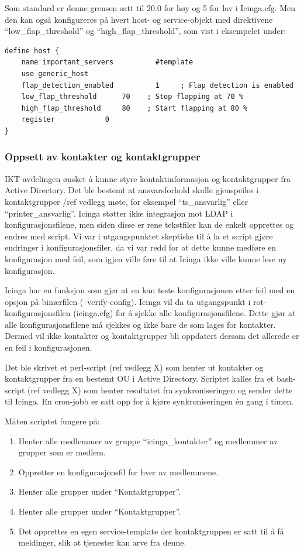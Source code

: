Som standard er denne grensen satt til 20.0 for høy og 5 for lav i Icinga.cfg. Men den kan også konfigureres på hvert host- og service-objekt med direktivene “low\_flap\_threshold” og “high\_flap\_threshold”, som vist i eksempelet under:

\begin{lstlisting}
define host {
	name important_servers  		#template
	use generic_host
	flap_detection_enabled          1     ; Flap detection is enabled
	low_flap_threshold		70    ; Stop flapping at 70 %
	high_flap_threshold		80    ; Start flapping at 80 %
	register			0
}
\end{lstlisting}

\subsubsection{Oppsett av kontakter og kontaktgrupper}


IKT-avdelingen ønsket å kunne styre kontaktinformasjon og kontaktgrupper fra Active Directory. Det ble bestemt at ansvarsforhold skulle gjenspeiles i kontaktgrupper /ref {vedlegg møte}, for eksempel “ts\_ansvarlig” eller “printer\_ansvarlig”. Icinga støtter ikke integrasjon mot LDAP i konfigurasjonsfilene, men siden disse er rene tekstfiler kan de enkelt opprettes og endres med script. Vi var i utgangspunktet skeptiske til å la et script gjøre endringer i konfigurasjonsfiler, da vi var redd for at dette kunne medføre en konfigurasjon med feil, som igjen ville føre til at Icinga ikke ville kunne lese ny konfigurasjon. 

Icinga har en funksjon som gjør at en kan teste konfigurasjonen etter feil med en opsjon på binærfilen (--verify-config). Icinga vil da ta utgangspunkt i rot-konfigurasjonsfilen (icinga.cfg) for å sjekke alle konfigurasjonsfilene. Dette gjør at alle konfigurasjonsfilene må sjekkes og ikke bare de som lages for kontakter. Dermed vil ikke kontakter og kontaktgrupper bli oppdatert dersom det allerede er en feil i konfigurasjonen. 

Det ble skrivet et perl-script (ref vedlegg X) som henter ut kontakter og kontaktgrupper fra en bestemt OU i Active Directory. Scriptet kalles fra et bash-script (ref vedlegg X) som henter resultatet fra synkroniseringen og sender dette til Icinga. En cron-jobb er satt opp for å kjøre synkroniseringen én gang i timen.

Måten scriptet fungere på:
\begin{enumerate}
	\item Henter alle medlemmer av gruppe “icinga\_kontakter” og medlemmer av grupper som er medlem.
	\item Oppretter en konfigurasjonsfil for hver av medlemmene.
	\item Henter alle grupper under “Kontaktgrupper”.
	\item Henter alle grupper under “Kontaktgrupper”.
	\item Det opprettes en egen service-template der kontaktgruppen er satt til å få meldinger, slik at tjenester kan arve fra denne.
\end{enumerate}

